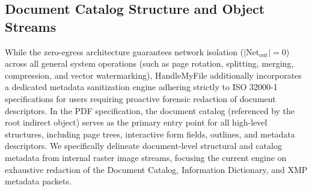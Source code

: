 \documentclass[journal]{IEEEtran}
\begin{document}
\subsection{Document Catalog Structure and Object Streams}
While the zero-egress architecture guarantees network isolation ($|\text{Net}_{\text{out}}| = 0$) across all general system operations (such as page rotation, splitting, merging, compression, and vector watermarking), HandleMyFile additionally incorporates a dedicated metadata sanitization engine adhering strictly to ISO 32000-1 specifications for users requiring proactive forensic redaction of document descriptors. In the PDF specification, the document catalog (referenced by the root indirect object) serves as the primary entry point for all high-level structures, including page trees, interactive form fields, outlines, and metadata descriptors. We specifically delineate document-level structural and catalog metadata from internal raster image streams, focusing the current engine on exhaustive redaction of the Document Catalog, Information Dictionary, and XMP metadata packets.
\end{document}
